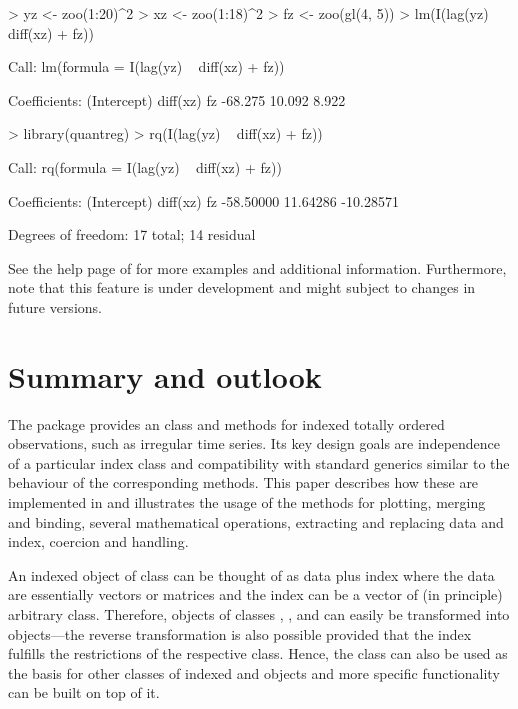 \documentclass{Z}
\begin{document}
\begin{Schunk}
\begin{Sinput}
> yz <- zoo(1:20)^2
> xz <- zoo(1:18)^2
> fz <- zoo(gl(4, 5))
> lm(I(lag(yz) ~ diff(xz) + fz))
\end{Sinput}
\begin{Soutput}
Call:
lm(formula = I(lag(yz) ~ diff(xz) + fz))

Coefficients:
(Intercept)     diff(xz)           fz  
    -68.275       10.092        8.922  
\end{Soutput}
\begin{Sinput}
> library(quantreg)
> rq(I(lag(yz) ~ diff(xz) + fz))
\end{Sinput}
\begin{Soutput}
Call:
rq(formula = I(lag(yz) ~ diff(xz) + fz))

Coefficients:
(Intercept)    diff(xz)          fz 
  -58.50000    11.64286   -10.28571 

Degrees of freedom: 17 total; 14 residual
\end{Soutput}
\end{Schunk}

See the help page of  for more examples
and additional information. Furthermore, note that this feature is under 
development and might subject to changes in future versions.



\section{Summary and outlook} \label{sec:summary}

The package  provides an  class and methods
for indexed totally ordered observations, such as irregular time series.
Its key design goals are independence of a particular index class 
and compatibility with standard generics similar to the behaviour of 
the corresponding  methods. This paper describes how
these are implemented in  and illustrates the usage of 
the methods for plotting, merging and
binding, several mathematical operations, extracting and replacing data
and index, coercion and  handling.

An indexed object of class  can be thought of as data plus index
where the data are essentially vectors or matrices and the index can be
a vector of (in principle) arbitrary class. Therefore, objects of classes
, ,  and  can easily
be transformed into  objects---the reverse transformation is also possible 
provided that the index fulfills the restrictions of the respective class.
Hence, the  class can also be used as the basis for other
classes of indexed and objects and more specific functionality can be built on
top of it.
\end{document}
